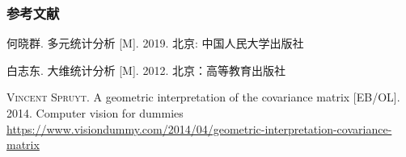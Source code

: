 

\begin{frame}[fragile]
    \frametitle{参考文献}
    \tiny
    \begin{thebibliography}{99}
        \bibitem{}
        \textsc{何晓群}.
        \newblock 多元统计分析 [M]. 2019.
        \newblock 北京: 中国人民大学出版社

        \bibitem{}
        \textsc{白志东}.
        \newblock 大维统计分析 [M]. 2012.
        \newblock 北京：高等教育出版社



        \bibitem{}
        \textsc{Vincent Spruyt}.
        \newblock A geometric interpretation of the covariance matrix [EB/OL]. 2014.
        \newblock Computer vision for dummies
        \newblock \url{https://www.visiondummy.com/2014/04/geometric-interpretation-covariance-matrix}
        
        \end{thebibliography}
\end{frame}


\begin{frame}
    \titlepage
\end{frame}